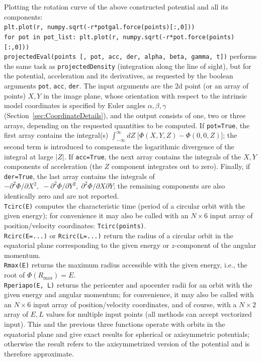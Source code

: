\documentclass[12pt]{article}
\begin{document}
Plotting the rotation curve of the above constructed potential and all its components:\\
\texttt{plt.plot(r, numpy.sqrt(-r*potgal.force(points)[:,0]))}\\
\texttt{for pot in pot_list: plt.plot(r, numpy.sqrt(-r*pot.force(points)[:,0]))}\\[2mm]
\texttt{projectedEval(points [, pot, acc, der, alpha, beta, gamma, t])} performs the same task as \texttt{projectedDensity} (integration along the line of sight), but for the potential, acceleration and its derivatives, as requested by the boolean arguments \texttt{pot}, \texttt{acc}, \texttt{der}. The input arguments are the 2d point (or an array of points) $X,Y$ in the image plane, whose orientation with respect to the intrinsic model coordinates is specified by Euler angles $\alpha, \beta, \gamma$ (Section~\ref{sec:CoordinateDetails}), and the output consists of one, two or three arrays, depending on the requested quantities to be computed. If \texttt{pot=True}, the first array contains the integral(s) $\int_{-\infty}^{\infty} dZ\; \big[\Phi(X,Y,Z)-\Phi(0,0,Z)]$; the second term is introduced to compensate the logarithmic divergence of the integral at large $|Z|$. If \texttt{acc=True}, the next array contains the integrals of the $X,Y$ components of acceleration (the $Z$ component integrates out to zero). Finally, if \texttt{der=True}, the last array contains the integrals of $-\partial^2 \Phi / \partial X^2,\; -\partial^2 \Phi / \partial Y^2,\; \partial^2 \Phi / \partial X \partial Y$; the remaining components are also identically zero and are not reported.\\[2mm]
\texttt{Tcirc(E)} computes the characteristic time (period of a circular orbit with the given energy); for convenience it may also be called with an $N\times6$ input array of position/velocity coordinates: \texttt{Tcirc(points)}.\\[2mm]
\texttt{Rcirc(E=...)} or \texttt{Rcirc(L=...)} return the radius of a circular orbit in the equatorial plane corresponding to the given energy or $z$-component of the angular momentum.\\[2mm]
\texttt{Rmax(E)} returns the maximum radius accessible with the given energy, i.e., the root of $\Phi(R_\mathrm{max})=E$.\\[2mm]
\texttt{Rperiapo(E, L)} returns the pericenter and apocenter radii for an orbit with the given energy and angular momentum; for convenience, it may also be called with an $N\times6$ input array of position/velocity coordinates, and of course, with a $N\times2$ array of $E,L$ values for multiple input points (all methods can accept vectorized input). This and the previous three functions operate with orbits in the equatorial plane and give exact results for spherical or axisymmetric potentials; otherwise the result refers to the axisymmetrized version of the potential and is therefore approximate. \\[2mm]
\end{document}
